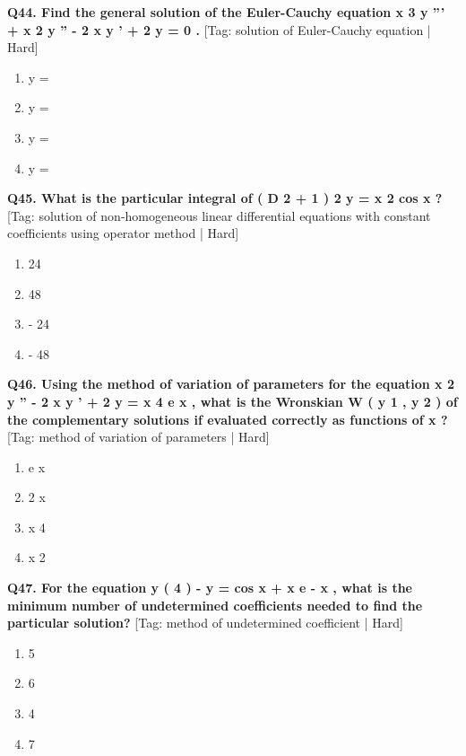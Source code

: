 \noindent\textbf{Q44. Find the general solution of the Euler-Cauchy equation x 3 y ''' + x 2 y '' - 2 x y ' + 2 y = 0 .} \hfill [Tag: solution of Euler-Cauchy equation | Hard]
\begin{enumerate}[label=(\alph*),topsep=2pt,itemsep=1pt,partopsep=0pt,parsep=0pt]
    \item {{y =}}
    \item {{y =}}
    \item {{y =}}
    \item {{y =}}
\end{enumerate}
\vspace{2mm}

\noindent\textbf{Q45. What is the particular integral of ( D 2 + 1 ) 2 y = x 2 cos x ?} \hfill [Tag: solution of non-homogeneous linear differential equations with constant coefficients using operator method | Hard]
\begin{enumerate}[label=(\alph*),topsep=2pt,itemsep=1pt,partopsep=0pt,parsep=0pt]
    \item {{24}}
    \item {{48}}
    \item {{- 24}}
    \item {{- 48}}
\end{enumerate}
\vspace{2mm}

\noindent\textbf{Q46. Using the method of variation of parameters for the equation x 2 y '' - 2 x y ' + 2 y = x 4 e x , what is the Wronskian W ( y 1 , y 2 ) of the complementary solutions if evaluated correctly as functions of x ?} \hfill [Tag: method of variation of parameters | Hard]
\begin{enumerate}[label=(\alph*),topsep=2pt,itemsep=1pt,partopsep=0pt,parsep=0pt]
    \item {{e x}}
    \item {{2 x}}
    \item {{x 4}}
    \item {{x 2}}
\end{enumerate}
\vspace{2mm}

\noindent\textbf{Q47. For the equation y ( 4 ) - y = cos x + x e - x , what is the minimum number of undetermined coefficients needed to find the particular solution?} \hfill [Tag: method of undetermined coefficient | Hard]
\begin{enumerate}[label=(\alph*),topsep=2pt,itemsep=1pt,partopsep=0pt,parsep=0pt]
    \item {{5}}
    \item {{6}}
    \item {{4}}
    \item {{7}}
\end{enumerate}
\vspace{2mm}

